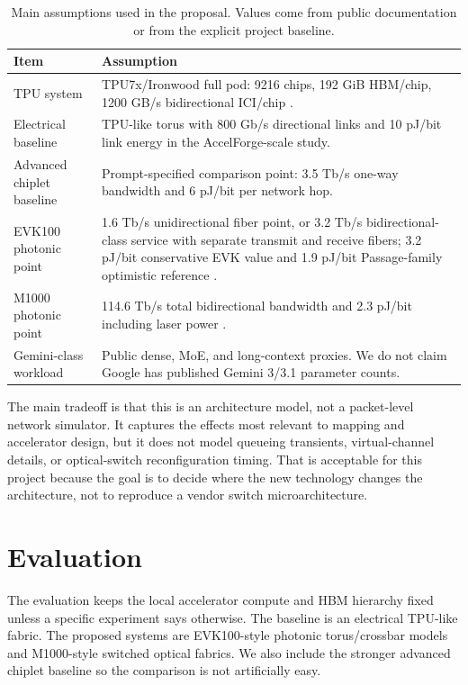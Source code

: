 \documentclass[conference,onecolumn]{IEEEtran}
\newcommand{\pjbit}{pJ/bit}
\newcommand{\tbps}{Tb/s}
\newcommand{\gbs}{GB/s}
\begin{document}
\begin{table}[t]
\centering
\caption{Main assumptions used in the proposal. Values come from public
documentation or from the explicit project baseline.}
\label{tab:assumptions}
\footnotesize
\begin{tabularx}{\linewidth}{lY}
\toprule
Item & Assumption \\
\midrule
TPU system & TPU7x/Ironwood full pod: 9216 chips, 192 GiB HBM/chip, 1200 \gbs{} bidirectional ICI/chip \cite{tpu7x}. \\
Electrical baseline & TPU-like torus with 800 Gb/s directional links and 10 \pjbit{} link energy in the AccelForge-scale study. \\
Advanced chiplet baseline & Prompt-specified comparison point: 3.5 \tbps{} one-way bandwidth and 6 \pjbit{} per network hop. \\
EVK100 photonic point & 1.6 \tbps{} unidirectional fiber point, or 3.2 \tbps{} bidirectional-class service with separate transmit and receive fibers; 3.2 \pjbit{} conservative EVK value and 1.9 \pjbit{} Passage-family optimistic reference \cite{evk100,passage}. \\
M1000 photonic point & 114.6 \tbps{} total bidirectional bandwidth and 2.3 \pjbit{} including laser power \cite{m1000}. \\
Gemini-class workload & Public dense, MoE, and long-context proxies. We do not claim Google has published Gemini 3/3.1 parameter counts. \\
\bottomrule
\end{tabularx}
\end{table}

The main tradeoff is that this is an architecture model, not a packet-level
network simulator. It captures the effects most relevant to mapping and
accelerator design, but it does not model queueing transients, virtual-channel
details, or optical-switch reconfiguration timing. That is acceptable for this
project because the goal is to decide where the new technology changes the
architecture, not to reproduce a vendor switch microarchitecture.

\section{Evaluation}

The evaluation keeps the local accelerator compute and HBM hierarchy fixed
unless a specific experiment says otherwise. The baseline is an electrical
TPU-like fabric. The proposed systems are EVK100-style photonic torus/crossbar
models and M1000-style switched optical fabrics. We also include the stronger
advanced chiplet baseline so the comparison is not artificially easy.
\end{document}
